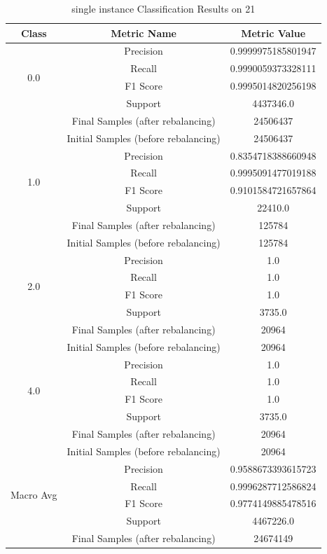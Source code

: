 \begin{longtable}{|c|c|c|}
\caption{single instance Classification Results on 21} \label{tab:21_single_instance_classifiers_results} \\
\hline
Class & Metric Name & Metric Value \\
\hline
\multirow{4}{*}{0.0} & Precision & 0.9999975185801947 \\
 & Recall & 0.9990059373328111 \\
 & F1 Score & 0.9995014820256198 \\
 & Support & 4437346.0 \\
 & Final Samples (after rebalancing) & 24506437 \\
 & Initial Samples (before rebalancing) & 24506437 \\
\hline
\multirow{4}{*}{1.0} & Precision & 0.8354718388660948 \\
 & Recall & 0.9995091477019188 \\
 & F1 Score & 0.9101584721657864 \\
 & Support & 22410.0 \\
 & Final Samples (after rebalancing) & 125784 \\
 & Initial Samples (before rebalancing) & 125784 \\
\hline
\multirow{4}{*}{2.0} & Precision & 1.0 \\
 & Recall & 1.0 \\
 & F1 Score & 1.0 \\
 & Support & 3735.0 \\
 & Final Samples (after rebalancing) & 20964 \\
 & Initial Samples (before rebalancing) & 20964 \\
\hline
\multirow{4}{*}{4.0} & Precision & 1.0 \\
 & Recall & 1.0 \\
 & F1 Score & 1.0 \\
 & Support & 3735.0 \\
 & Final Samples (after rebalancing) & 20964 \\
 & Initial Samples (before rebalancing) & 20964 \\
\hline
\multirow{4}{*}{Macro Avg} & Precision & 0.9588673393615723 \\
 & Recall & 0.9996287712586824 \\
 & F1 Score & 0.9774149885478516 \\
 & Support & 4467226.0 \\
 & Final Samples (after rebalancing) & 24674149 \\

\end{longtable}
